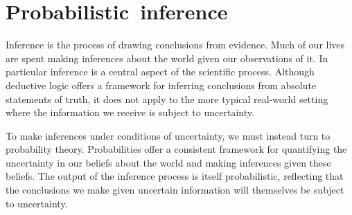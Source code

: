 \chapter{\mbox{Probabilistic inference}}\label{ch:probabilistic-inference}

Inference is the process of drawing conclusions from evidence. Much of our lives are spent making inferences about the world given our observations of it. In particular inference is a central aspect of the scientific process. Although deductive logic offers a framework for inferring conclusions from absolute statements of truth, it does not apply to the more typical real-world setting where the information we receive is subject to uncertainty. 

To make inferences under conditions of uncertainty, we must instead turn to probability theory. Probabilities offer a consistent framework for quantifying the uncertainty in our beliefs about the world and making inferences given these beliefs. The output of the inference process is itself probabilistic, reflecting that the conclusions we make given uncertain information will themselves be subject to uncertainty. 



